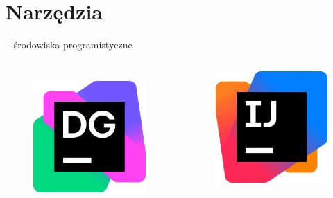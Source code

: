 \section{Narzędzia}
\begin{frame}{\insertsection \space-- środowiska programistyczne}
	\begin{columns}
			\begin{figure}
				\centering
				\includegraphics[width=1\linewidth]{../images/DataGrip_icon}
				\label{fig:datagripicon}
			\end{figure}		
			\begin{figure}
				\centering
				\includegraphics[width=1\linewidth]{../images/IntelliJ_IDEA_icon}

\end{figure}
\end{columns}
\end{frame}
